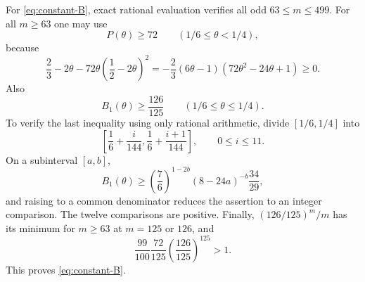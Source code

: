 \documentclass[11pt]{article}
\numberwithin{equation}{section}
\begin{document}
For \eqref{eq:constant-B}, exact rational evaluation verifies all odd $63\le m\le499$. For all $m\ge63$ one may use
\[
        P(\theta)\ge72
        \qquad(1/6\le\theta<1/4),
\]
because
\[
 \frac23-2\theta
 -72\theta\left(\frac12-2\theta\right)^2
 =-\frac23(6\theta-1)(72\theta^2-24\theta+1)\ge0.
\]
Also
\[
        B_1(\theta)\ge\frac{126}{125}
        \qquad(1/6\le\theta\le1/4).
\]
To verify the last inequality using only rational arithmetic, divide $[1/6,1/4]$ into
\[
 \left[\frac16+\frac{i}{144},\frac16+\frac{i+1}{144}\right],
 \qquad 0\le i\le11.
\]
On a subinterval $[a,b]$,
\[
        B_1(\theta)
        \ge\left(\frac76\right)^{1-2b}
        (8-24a)^{-b}\frac{34}{29},
\]
and raising to a common denominator reduces the assertion to an integer comparison. The twelve comparisons are positive. Finally, $(126/125)^m/m$ has its minimum for $m\ge63$ at $m=125$ or $126$, and
\[
        \frac{99}{100}\frac{72}{125}
        \left(\frac{126}{125}\right)^{125}>1.
\]
This proves \eqref{eq:constant-B}.
\end{document}
